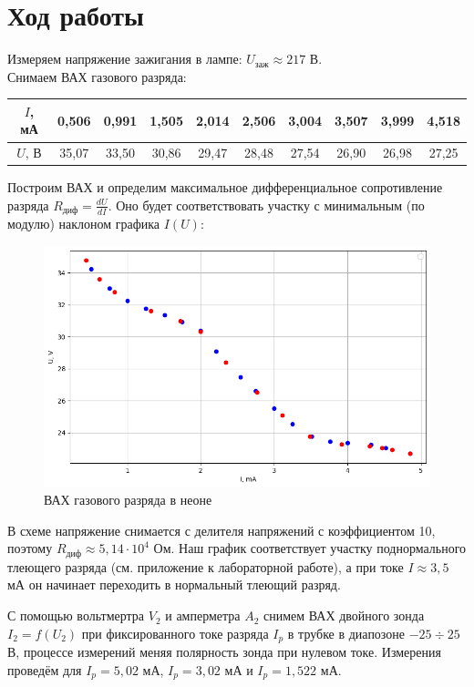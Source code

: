 \documentclass[a4paper, 12pt]{article}
\begin{document}
	\section*{Ход работы}
	Измеряем напряжение зажигания в лампе: $U_{\text{заж}} \approx 217 $ В.\\
	Снимаем ВАХ газового разряда:
	\begin{table}[h!]
		\centering
		\begin{tabular}{|c|c|c|c|c|c|c|c|c|c|}
			\hline
			$I$, мА & 0,506 & 0,991 & 1,505 & 2,014 & 2,506 & 3,004 & 3,507 & 3,999 & 4,518 \\ \hline
			$U$, В & 35,07 & 33,50 & 30,86 & 29,47 & 28,48 & 27,54 & 26,90 & 26,98 & 27,25 \\ \hline
		\end{tabular}
	\end{table}
	
	Построим ВАХ и определим максимальное дифференциальное сопротивление разряда $R_{\text{диф}} = \frac{dU}{dI}$. Оно будет соответствовать участку с минимальным (по модулю) наклоном графика $I(U)$:
	
	\begin{figure}[h!]
		\centering
		\includegraphics[width = \textwidth]{data/data1.png}
		\caption{ВАХ газового разряда в неоне}
	\end{figure}
	В схеме напряжение снимается с делителя напряжений с коэффициентом 10, поэтому $R_{\text{диф}} \approx 5,14 \cdot 10^4$ Ом. Наш график соответствует участку поднормального тлеющего разряда (см. приложение к лабораторной работе), а при токе $I \approx 3,5$ мА он начинает переходить в нормальный тлеющий разряд.
	
	\newpage
	С помощью вольтмертра $V_2$ и амперметра $A_2$ снимем ВАХ двойного зонда $I_2 = f(U_2)$ при фиксированного токе разряда $I_p$ в трубке в диапозоне $-25 \div 25$ В, процессе измерений меняя полярность зонда при нулевом токе. Измерения проведём для $I_p = 5,02$ мА, $I_p = 3,02$ мА  и $I_p = 1,522$ мА.
	
\end{document}

